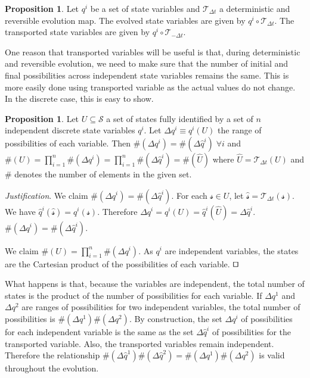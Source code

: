 \documentclass[smallextended]{svjour3}
\numberwithin{equation}{section}
\newenvironment{justification}{\emph{Justification}.}{\hfill\(\qed\)}
\theoremstyle{definition}
\newtheorem{prop}[equation]{Proposition}
\newenvironment{justification}{\emph{Justification}.}{\qed}
\begin{document}
\begin{prop}\label{prop:evolved_transported_variable}
Let $q^i$ be a set of state variables and $\mathcal{T}_{\Delta t}$ a deterministic and reversible evolution map. The evolved state variables are given by $q^i \circ \mathcal{T}_{\Delta t}$. The transported state variables are given by $q^i \circ \mathcal{T}_{-\Delta t}$.
\end{prop}

One reason that transported variables will be useful is that, during deterministic and reversible evolution, we need to make sure that the number of initial and final possibilities across independent state variables remains the same. This is more easily done using transported variable as the actual values do not change. In the discrete case, this is easy to show.

\begin{prop}\label{prop:discrete_measure}
	Let $U \subseteq \mathcal{S}$ a set of states fully identified by a set of $n$ independent discrete state variables $q^i$. Let $\Delta q^i \equiv q^i(U)$ the range of possibilities of each variable. Then $\#(\Delta q^i)=\#(\Delta \hat{q}^i) \; \forall i$ and $\#(U)=\prod\limits_{i=1}^{n}\#(\Delta q^i)=\prod\limits_{i=1}^{n}\#(\Delta \hat{q}^i)=\#(\hat{U})$ where $\hat{U}=\mathcal{T}_{\Delta t}(U)$ and $\#$ denotes the number of elements in the given set.
\end{prop}

\begin{justification}
	We claim $\#(\Delta q^i)=\#(\Delta \hat{q}^i)$. For each $\mathcal{s} \in U$, let $\hat{\mathcal{s}}=\mathcal{T}_{\Delta t}(\mathcal{s})$. We have $\hat{q}^i(\hat{\mathcal{s}}) = q^i(\mathcal{s})$. Therefore $\Delta q^i = q^i(U) = \hat{q}^i(\hat{U})=\Delta \hat{q}^i$. $\#(\Delta q^i)=\#(\Delta \hat{q}^i)$.
	
	We claim $\#(U)=\prod\limits_{i=1}^{n}\#(\Delta q^i)$. As $q^i$ are independent variables, the states are the Cartesian product of the possibilities of each variable.
\end{justification}

What happens is that, because the variables are independent, the total number of states is the product of the number of possibilities for each variable. If $\Delta q^1$ and $\Delta q^2$ are ranges of possibilities for two independent variables, the total number of possibilities is $\#(\Delta q^1) \#(\Delta q^2)$. By construction, the set $\Delta q^i$ of possibilities for each independent variable is the same as the set $\Delta \hat{q}^i$ of possibilities for the transported variable. Also, the transported variables remain independent. Therefore the relationship $\#(\Delta \hat{q}^1) \#(\Delta \hat{q}^2) = \#(\Delta q^1) \#(\Delta q^2)$ is valid throughout the evolution.
\end{document}
